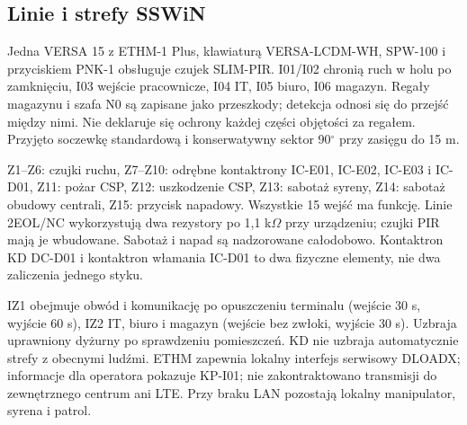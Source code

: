 \subsection{Linie i strefy SSWiN}
Jedna VERSA 15 z ETHM-1 Plus, klawiaturą VERSA-LCDM-WH, SPW-100 i przyciskiem PNK-1 obsługuje \PirCount{} czujek SLIM-PIR. I01/I02 chronią ruch w holu po zamknięciu, I03 wejście pracownicze, I04 IT, I05 biuro, I06 magazyn. Regały magazynu i szafa N0 są zapisane jako przeszkody; detekcja odnosi się do przejść między nimi. Nie deklaruje się ochrony każdej części objętości za regałem. Przyjęto soczewkę standardową i konserwatywny sektor 90$^\circ$ przy zasięgu do 15 m.\cite{S-PIR,S-SSWIN}

Z1--Z6: czujki ruchu, Z7--Z10: odrębne kontaktrony IC-E01, IC-E02, IC-E03 i IC-D01, Z11: pożar CSP, Z12: uszkodzenie CSP, Z13: sabotaż syreny, Z14: sabotaż obudowy centrali, Z15: przycisk napadowy. Wszystkie 15 wejść ma funkcję. Linie 2EOL/NC wykorzystują dwa rezystory po 1,1 k$\Omega$ przy urządzeniu; czujki PIR mają je wbudowane. Sabotaż i napad są nadzorowane całodobowo. Kontaktron KD DC-D01 i kontaktron włamania IC-D01 to dwa fizyczne elementy, nie dwa zaliczenia jednego styku.

IZ1 obejmuje obwód i komunikację po opuszczeniu terminalu (wejście 30 s, wyjście 60 s), IZ2 IT, biuro i magazyn (wejście bez zwłoki, wyjście 30 s). Uzbraja uprawniony dyżurny po sprawdzeniu pomieszczeń. KD nie uzbraja automatycznie strefy z obecnymi ludźmi. ETHM zapewnia lokalny interfejs serwisowy DLOADX; informacje dla operatora pokazuje KP-I01; nie zakontraktowano transmisji do zewnętrznego centrum ani LTE. Przy braku LAN pozostają lokalny manipulator, syrena i patrol.\cite{S-ETHM,S-LCD,S-SIREN}
